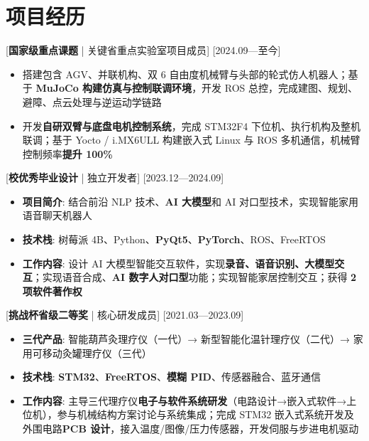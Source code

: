 \documentclass{resume-photo}
\newcommand{\hl}[1]{\textbf{\textcolor{hlred}{#1}}}
\begin{document}
\section{项目经历}

[\textnormal{\hl{国家级重点课题} | 关键省重点实验室项目成员}]
[2024.09—至今]

\begin{itemize}
  \item 搭建包含 AGV、并联机构、双 6 自由度机械臂与头部的轮式仿人机器人；基于 \hl{MuJoCo 构建仿真与控制联调环境}，开发 ROS 总控，完成建图、规划、避障、点云处理与逆运动学链路
  \item 开发\hl{自研双臂与底盘电机控制系统}，完成 STM32F4 下位机、执行机构及整机联调；基于 Yocto / i.MX6ULL 构建嵌入式 Linux 与 ROS 多机通信，机械臂控制频率\hl{提升 100\%}
\end{itemize}

[\textnormal{\hl{校优秀毕业设计} | 独立开发者}]
[2023.12—2024.09]

\begin{itemize}
  \item \textbf{项目简介}: 结合前沿 NLP 技术、\hl{AI 大模型}和 AI 对口型技术，实现智能家用语音聊天机器人
  \item \textbf{技术栈}: 树莓派 4B、Python、\hl{PyQt5}、\hl{PyTorch}、ROS、FreeRTOS
  \item \textbf{工作内容}: 设计 AI 大模型智能交互软件，实现\hl{录音、语音识别、大模型交互}；实现语音合成、\hl{AI 数字人对口型}功能；实现智能家居控制交互；获得 \hl{2 项软件著作权}
\end{itemize}

[\textnormal{\hl{挑战杯省级二等奖} | 核心研发成员}]
[2021.03—2023.09]

\begin{itemize}
  \item \textbf{三代产品}: 智能葫芦灸理疗仪（一代）→ 新型智能化温针理疗仪（二代）→ 家用可移动灸罐理疗仪（三代）
  \item \textbf{技术栈}: \hl{STM32}、\hl{FreeRTOS}、\hl{模糊 PID}、传感器融合、蓝牙通信
  \item \textbf{工作内容}: 主导三代理疗仪\hl{电子与软件系统研发}（电路设计→嵌入式软件→上位机），参与机械结构方案讨论与系统集成；完成 STM32 嵌入式系统开发及外围电路\hl{PCB 设计}，接入温度/图像/压力传感器，开发伺服与步进电机驱动
\end{itemize}

\end{document}
